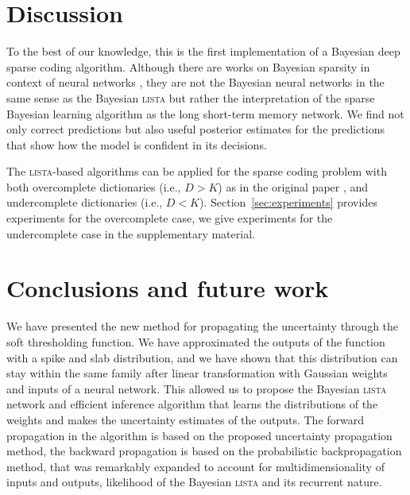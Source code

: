 \documentclass{article}
\begin{document}
\section{Discussion}
\label{sec:discussion}
To the best of our knowledge, this is the first implementation of a Bayesian deep sparse coding algorithm. Although there are works on Bayesian sparsity in context of neural networks \citep{he2017bayesian}, they are not the Bayesian neural networks in the same sense as the Bayesian \textsc{lista} but rather the interpretation of the sparse Bayesian  learning algorithm as the long short-term memory network. We find not only correct predictions but also useful posterior estimates for the predictions that show how the model is confident in its decisions.


The \textsc{lista}-based algorithms can be applied for the sparse coding problem with both overcomplete dictionaries (i.e., $D > K$) as in the original paper \citep{gregor2010learning}, and undercomplete dictionaries (i.e., $D < K$). Section~\ref{sec:experiments} provides experiments for the overcomplete case, we give experiments for the undercomplete case in the supplementary material.

\section{Conclusions and future work}
\label{sec:conclusions}
We have presented the new method for propagating the uncertainty through the soft thresholding function. %
We have approximated the outputs of the function with a spike and slab distribution, and we have shown that this distribution can stay within the same family after linear transformation with Gaussian weights and inputs of a neural network. This allowed us to propose the Bayesian \textsc{lista} network and efficient inference algorithm that learns the distributions of the weights and makes the uncertainty estimates of the outputs. The forward propagation in the algorithm is based on the proposed uncertainty propagation method, the backward propagation is based on the probabilistic backpropagation method, that was remarkably expanded to account for multidimensionality of inputs and outputs, likelihood of the Bayesian \textsc{lista} and its recurrent nature.
\end{document}
